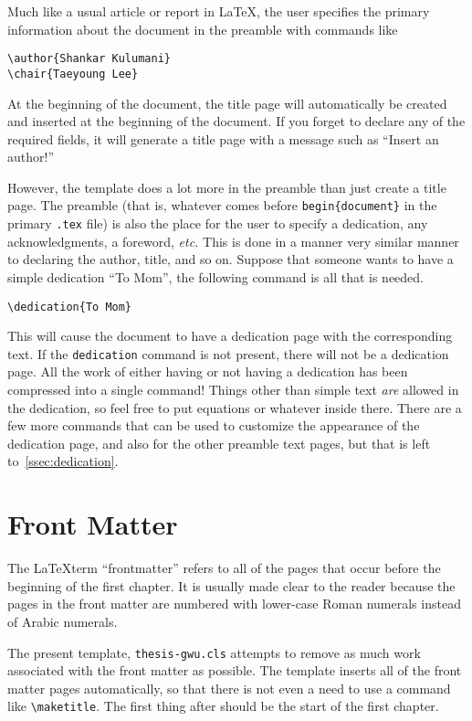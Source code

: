 Much like a usual article or report in \LaTeX, the user specifies the primary information about the document in the preamble with commands like
\begin{verbatim}
\author{Shankar Kulumani}
\chair{Taeyoung Lee}
\end{verbatim}
At the beginning of the document, the title page will automatically be created and inserted at the beginning of the document.  
If you forget to declare any of the required fields, it will generate a title page with a message such as ``Insert an author!''

However, the template does a lot more in the preamble than just create a title page.  
The preamble (that is, whatever comes before \texttt{begin\{document\}} in the primary \texttt{.tex} file) is also the place for the user to specify a dedication, any acknowledgments, a foreword, \textit{etc.}  
This is done in a manner very similar manner to declaring the author, title, and so on. Suppose that someone wants to have a simple dedication ``To Mom'', the following command is all that is needed.
\begin{verbatim}
\dedication{To Mom}
\end{verbatim}
This will cause the document to have a dedication page with the
corresponding text.  
If the \texttt{dedication} command is not present, there will not be a dedication page.  
All the work of either having or not having a dedication has been compressed into a single command!
Things other than simple text \emph{are} allowed in the dedication, so feel free to put equations or whatever inside there.  
There are a few more commands that can be used to customize the appearance of the dedication page, and also for the other preamble text pages, but that is left to~\cref{ssec:dedication}.

\section{Front Matter}
The \LaTeX term ``frontmatter'' refers to all of the pages that occur before the beginning of the first chapter.  
It is usually made clear to the reader because the pages in the front matter are numbered with lower-case Roman numerals instead of Arabic numerals.

The present template, \texttt{thesis-gwu.cls} attempts to remove as much work associated with the front matter as possible.  
The template inserts all of the front matter pages automatically, so that there is
not even a need to use a command like \verb+\maketitle+.  
The first thing after \verb++ should be the start of the first
chapter.

